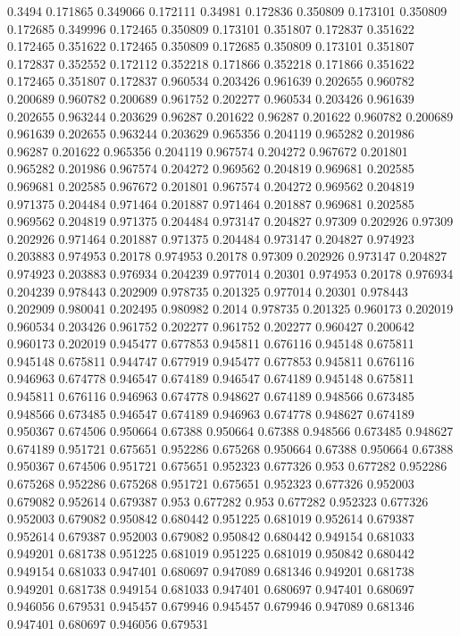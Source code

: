 0.3494 0.171865
0.349066 0.172111
0.34981 0.172836
0.350809 0.173101
0.350809 0.172685
0.349996 0.172465
0.350809 0.173101
0.351807 0.172837
0.351622 0.172465
0.351622 0.172465
0.350809 0.172685
0.350809 0.173101
0.351807 0.172837
0.352552 0.172112
0.352218 0.171866
0.352218 0.171866
0.351622 0.172465
0.351807 0.172837
0.960534 0.203426
0.961639 0.202655
0.960782 0.200689
0.960782 0.200689
0.961752 0.202277
0.960534 0.203426
0.961639 0.202655
0.963244 0.203629
0.96287 0.201622
0.96287 0.201622
0.960782 0.200689
0.961639 0.202655
0.963244 0.203629
0.965356 0.204119
0.965282 0.201986
0.96287 0.201622
0.965356 0.204119
0.967574 0.204272
0.967672 0.201801
0.965282 0.201986
0.967574 0.204272
0.969562 0.204819
0.969681 0.202585
0.969681 0.202585
0.967672 0.201801
0.967574 0.204272
0.969562 0.204819
0.971375 0.204484
0.971464 0.201887
0.971464 0.201887
0.969681 0.202585
0.969562 0.204819
0.971375 0.204484
0.973147 0.204827
0.97309 0.202926
0.97309 0.202926
0.971464 0.201887
0.971375 0.204484
0.973147 0.204827
0.974923 0.203883
0.974953 0.20178
0.974953 0.20178
0.97309 0.202926
0.973147 0.204827
0.974923 0.203883
0.976934 0.204239
0.977014 0.20301
0.974953 0.20178
0.976934 0.204239
0.978443 0.202909
0.978735 0.201325
0.977014 0.20301
0.978443 0.202909
0.980041 0.202495
0.980982 0.2014
0.978735 0.201325
0.960173 0.202019
0.960534 0.203426
0.961752 0.202277
0.961752 0.202277
0.960427 0.200642
0.960173 0.202019
0.945477 0.677853
0.945811 0.676116
0.945148 0.675811
0.945148 0.675811
0.944747 0.677919
0.945477 0.677853
0.945811 0.676116
0.946963 0.674778
0.946547 0.674189
0.946547 0.674189
0.945148 0.675811
0.945811 0.676116
0.946963 0.674778
0.948627 0.674189
0.948566 0.673485
0.948566 0.673485
0.946547 0.674189
0.946963 0.674778
0.948627 0.674189
0.950367 0.674506
0.950664 0.67388
0.950664 0.67388
0.948566 0.673485
0.948627 0.674189
0.951721 0.675651
0.952286 0.675268
0.950664 0.67388
0.950664 0.67388
0.950367 0.674506
0.951721 0.675651
0.952323 0.677326
0.953 0.677282
0.952286 0.675268
0.952286 0.675268
0.951721 0.675651
0.952323 0.677326
0.952003 0.679082
0.952614 0.679387
0.953 0.677282
0.953 0.677282
0.952323 0.677326
0.952003 0.679082
0.950842 0.680442
0.951225 0.681019
0.952614 0.679387
0.952614 0.679387
0.952003 0.679082
0.950842 0.680442
0.949154 0.681033
0.949201 0.681738
0.951225 0.681019
0.951225 0.681019
0.950842 0.680442
0.949154 0.681033
0.947401 0.680697
0.947089 0.681346
0.949201 0.681738
0.949201 0.681738
0.949154 0.681033
0.947401 0.680697
0.947401 0.680697
0.946056 0.679531
0.945457 0.679946
0.945457 0.679946
0.947089 0.681346
0.947401 0.680697
0.946056 0.679531
